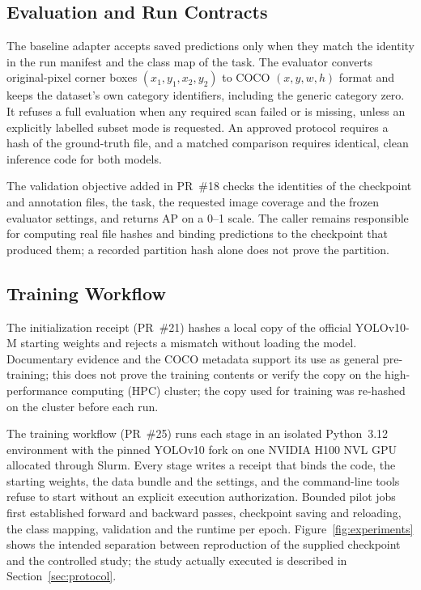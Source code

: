 \subsection{Evaluation and Run Contracts}
The baseline adapter accepts saved predictions only when they match the identity
in the run manifest and the class map of the task. The evaluator converts
original-pixel corner boxes $(x_1,y_1,x_2,y_2)$ to COCO $(x,y,w,h)$ format and
keeps the dataset's own category identifiers, including the generic category
zero. It refuses a full evaluation when any required scan failed or is missing,
unless an explicitly labelled subset mode is requested. An approved protocol
requires a hash of the ground-truth file, and a matched comparison requires
identical, clean inference code for both models.

The validation objective added in PR~\#18 checks the identities of the checkpoint
and annotation files, the task, the requested image coverage and the frozen
evaluator settings, and returns AP on a 0--1 scale. The caller remains responsible
for computing real file hashes and binding predictions to the checkpoint that
produced them; a recorded partition hash alone does not prove the partition.

\subsection{Training Workflow}
The initialization receipt (PR~\#21) hashes a local copy of the official
YOLOv10-M starting weights and rejects a mismatch without loading the model.
Documentary evidence and the COCO metadata support its use as general
pre-training; this does not prove the training contents or verify the copy on
the high-performance computing (HPC) cluster; the copy used for training was
re-hashed on the cluster before each run.

The training workflow (PR~\#25) runs each stage in an isolated Python~3.12
environment with the pinned YOLOv10 fork on one NVIDIA H100 NVL GPU allocated
through Slurm. Every stage writes a receipt that binds the code, the starting
weights, the data bundle and the settings, and the command-line tools refuse to
start without an explicit execution authorization. Bounded pilot jobs first
established forward and backward passes, checkpoint saving and reloading, the
class mapping, validation and the runtime per epoch. Figure~\ref{fig:experiments}
shows the intended separation between reproduction of the supplied checkpoint and
the controlled study; the study actually executed is described in
Section~\ref{sec:protocol}.

